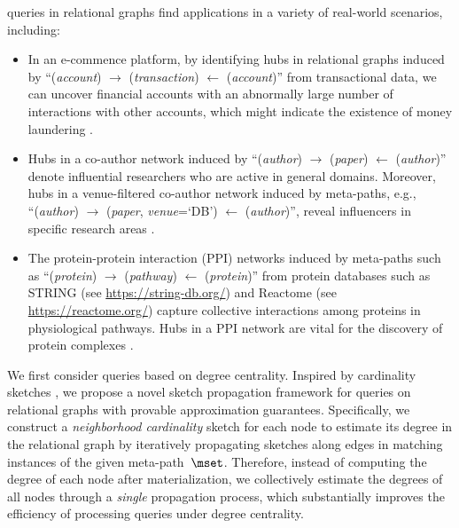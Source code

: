  \ced queries in relational graphs find applications in a variety of real-world scenarios, including:
\begin{itemize}[leftmargin=*]
    \item {} In an e-commence platform, by identifying hubs in relational graphs induced by ``(\emph{account}) $\rightarrow$ (\emph{transaction}) $\leftarrow$ (\emph{account})'' from transactional data, we can uncover financial accounts with an abnormally large number of interactions with other accounts, which might indicate the existence of money laundering \cite{cao2017hitfraud}.
    \item {} Hubs in a co-author network induced by ``(\emph{author}) $\rightarrow$ (\emph{paper}) $\leftarrow$ (\emph{author})'' \cite{mihara2015influence} denote influential researchers who are active in general domains. Moreover, hubs in a venue-filtered co-author network induced by meta-paths, e.g., ``(\emph{author}) $\rightarrow$ (\emph{paper}, \emph{venue}=`DB') $\leftarrow$ (\emph{author})'', reveal influencers in specific research areas \cite{shi2016constrained, li2014hrank}.
    \item {} The protein-protein interaction (PPI) networks induced by meta-paths such as ``(\emph{protein}) $\rightarrow$ (\emph{pathway}) $\leftarrow$ (\emph{protein})'' from protein databases such as \textsf{STRING} (see \url{https://string-db.org/}) and \textsf{Reactome} (see \url{https://reactome.org/}) capture collective interactions among proteins in physiological pathways. Hubs in a PPI network are vital for the discovery of protein complexes \cite{wu2009core, srihari2013survey}.
\end{itemize}

We first consider \ced queries based on degree centrality. Inspired by cardinality sketches \cite{estan2003bitmap, alon1996space, durand2003loglog, heule2013hyperloglog, gibbons2001distinct}, we propose a novel sketch propagation framework for \ced queries on relational graphs with provable approximation guarantees. Specifically, we construct a \emph{neighborhood cardinality} sketch for each node to estimate its degree in the relational graph by iteratively propagating sketches along edges in matching instances of the given meta-path~$\mset$. Therefore, instead of computing the degree of each node after materialization, we collectively estimate the degrees of all nodes through a \emph{single} propagation process, which substantially improves the efficiency of processing \ced queries under degree centrality.

